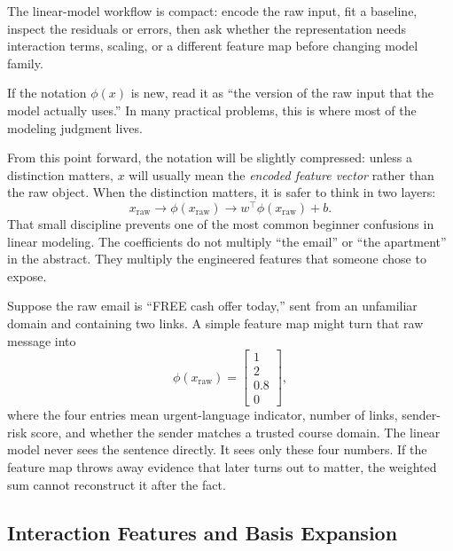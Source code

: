 \begin{practicalnote}
The linear-model workflow is compact: encode the raw input, fit a baseline, inspect the residuals or errors, then ask whether the representation needs interaction terms, scaling, or a different feature map before changing model family.
\end{practicalnote}

\begin{prereqbridge}
If the notation $\phi(x)$ is new, read it as ``the version of the raw input that the model actually uses.'' In many practical problems, this is where most of the modeling judgment lives.
\end{prereqbridge}

From this point forward, the notation will be slightly compressed: unless a distinction matters, \(x\) will usually mean the \emph{encoded feature vector} rather than the raw object. When the distinction matters, it is safer to think in two layers:
\[
x_{\text{raw}} \longrightarrow \phi(x_{\text{raw}}) \longrightarrow w^\top \phi(x_{\text{raw}}) + b.
\]
That small discipline prevents one of the most common beginner confusions in linear modeling. The coefficients do not multiply ``the email'' or ``the apartment'' in the abstract. They multiply the engineered features that someone chose to expose.

\begin{example}
Suppose the raw email is ``FREE cash offer today,'' sent from an unfamiliar domain and containing two links. A simple feature map might turn that raw message into
\[
\phi(x_{\text{raw}}) =
\begin{bmatrix}
1 \\
2 \\
0.8 \\
0
\end{bmatrix},
\]
where the four entries mean urgent-language indicator, number of links, sender-risk score, and whether the sender matches a trusted course domain. The linear model never sees the sentence directly. It sees only these four numbers. If the feature map throws away evidence that later turns out to matter, the weighted sum cannot reconstruct it after the fact.
\end{example}

\subsection{Interaction Features and Basis Expansion}

